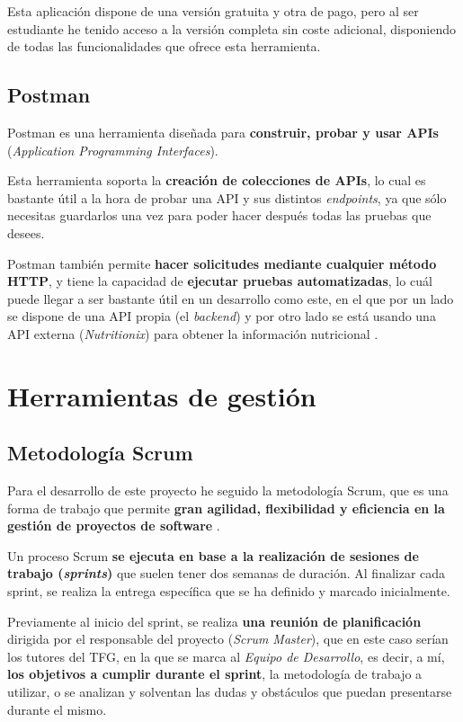 Esta aplicación dispone de una versión gratuita y otra de pago, pero al ser estudiante he tenido acceso a la versión completa sin coste adicional, disponiendo de todas las funcionalidades que ofrece esta herramienta. \cite{jetbrains:students}

\subsection{Postman}

Postman es una herramienta diseñada para \textbf{construir, probar y usar APIs} (\textit{Application Programming Interfaces}).

Esta herramienta soporta la \textbf{creación de colecciones de APIs}, lo cual es bastante útil a la hora de probar una API y sus distintos \textit{endpoints}, ya que sólo necesitas guardarlos una vez para poder hacer después todas las pruebas que desees.

Postman también permite\textbf{ hacer solicitudes mediante cualquier método HTTP}, y tiene la capacidad de \textbf{ejecutar pruebas automatizadas}, lo cuál puede llegar a ser bastante útil en un desarrollo como este, en el que por un lado se dispone de una API propia (el \textit{backend}) y por otro lado se está usando una API externa (\textit{Nutritionix}) para obtener la información nutricional \cite{postman:main}.


\section{Herramientas de gestión}

\subsection{Metodología Scrum}

Para el desarrollo de este proyecto he seguido la metodología Scrum, que es una forma de trabajo que permite \textbf{gran agilidad, flexibilidad y eficiencia en la gestión de proyectos de software} \cite{atlassian:scrum}.

Un proceso Scrum \textbf{se ejecuta en base a la realización de sesiones de trabajo (\textit{sprints})} que suelen tener dos semanas de duración. Al finalizar cada sprint, se realiza la entrega específica que se ha definido y marcado inicialmente.

Previamente al inicio del sprint, se realiza \textbf{una reunión de planificación} dirigida por el responsable del proyecto (\textit{Scrum Master}), que en este caso serían los tutores del TFG, en la que se marca al \textit{Equipo de Desarrollo}, es decir, a mí, \textbf{los objetivos a cumplir durante el sprint}, la metodología de trabajo a utilizar, o se analizan y solventan las dudas y obstáculos que puedan presentarse durante el mismo.

